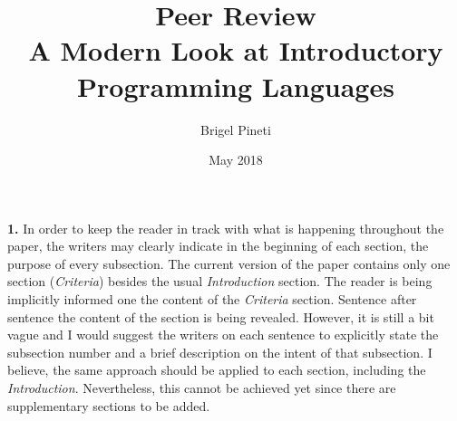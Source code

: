 \documentclass{article}
\title{\Large{Peer Review} \\
    \huge\textbf{{A Modern Look at Introductory Programming Languages}}}
\author{Brigel Pineti}
\date{May 2018}
\begin{document}
    
    \maketitle
    
    \section*{}
    \textbf{1.} In order to keep the reader in track with what is happening throughout the paper, the writers may clearly indicate in the beginning of each section, the purpose of every subsection. The current version of the paper contains only one section (\textit{Criteria}) besides the usual \textit{Introduction} section. The reader is being implicitly informed one the content of the \textit{Criteria} section. Sentence after sentence the content of the section is being revealed. However, it is still a bit vague and I would suggest the writers on each sentence to explicitly state the subsection number and a brief description on the intent of that subsection. I believe, the same approach should be applied to each section, including the \textit{Introduction}. Nevertheless, this cannot be achieved yet since there are supplementary sections to be added.  
    
    
\end{document}

